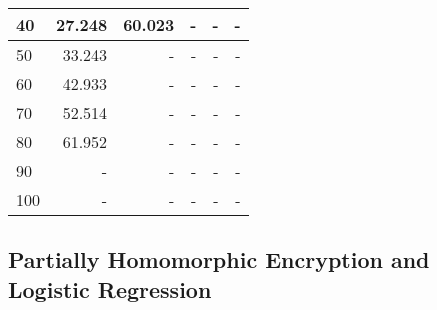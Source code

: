 \begin{table}[h]
\begin{tabular}{|l|r|r|r|r|r|}
40                               & 27.248          & 60.023           & -                & -                & -                \\ \hline
50                               & 33.243          & -                & -                & -                & -                \\ \hline
60                               & 42.933          & -                & -                & -                & -                \\ \hline
70                               & 52.514          & -                & -                & -                & -                \\ \hline
80                               & 61.952          & -                & -                & -                & -                \\ \hline
90                               & -               & -                & -                & -                & -                \\ \hline
100                              & -               & -                & -                & -                & -                \\ \hline
\end{tabular}
\end{table}

\clearpage
\subsection{Partially Homomorphic Encryption and Logistic Regression}
\label{app:phelr_exec}

